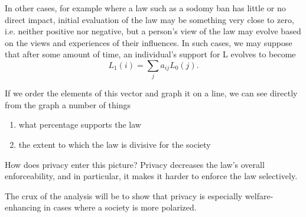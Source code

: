 In other cases, for example where a law such as a sodomy ban has little or no direct impact, initial evaluation of the law may be something very close to zero, i.e. neither positive nor negative, but a person's view of the law may evolve based on the views and experiences of their influences.  In such cases, we may suppose that after some amount of time, an individual's support for L evolves to become $$L_1(i)=\sum_ja_{ij}L_0(j).$$



%
%
%
%
%
%
%

If we order the elements of this vector and graph it on a line, we can see directly from the graph a number of things
\begin{enumerate}
\item what percentage supports the law
\item the extent to which the law is divisive for the society
\end{enumerate}

How does privacy enter this picture?
Privacy decreases the law's overall enforceability, and in particular, it makes it harder to enforce the law selectively.

The crux of the analysis will be to show that privacy is especially welfare-enhancing in cases where a society is more polarized.